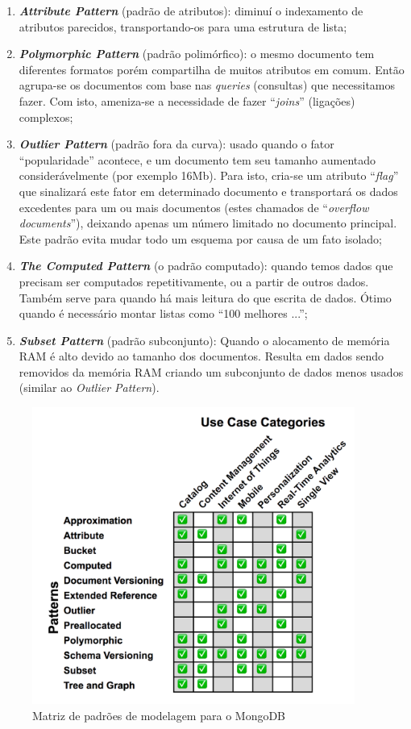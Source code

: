 \documentclass[
	12pt,				%
	openright,			%
	oneside,			%
	a4paper,			%
	english,			%
	french,				%
	spanish,			%
	brazil,				%
	]{abntex2}
\begin{document}
\begin{enumerate}
  \item \textbf{\textit{Attribute Pattern}} (padrão de atributos): diminuí o indexamento de atributos parecidos, transportando-os para uma estrutura de lista;
  \item \textbf{\textit{Polymorphic Pattern}} (padrão polimórfico): o mesmo documento tem diferentes formatos porém compartilha de muitos atributos em comum. Então agrupa-se os documentos com base nas \textit{queries} (consultas) que necessitamos fazer. Com isto, ameniza-se a necessidade de fazer ``\textit{joins}'' (ligações) complexos;
  \item \textbf{\textit{Outlier Pattern}} (padrão fora da curva): usado quando o fator ``popularidade'' acontece, e um documento tem seu tamanho aumentado considerávelmente (por exemplo 16Mb). Para isto, cria-se um atributo ``\textit{flag}'' que sinalizará este fator em determinado documento e transportará os dados excedentes para um ou mais documentos (estes chamados de ``\textit{overflow documents}''), deixando apenas um número limitado no documento principal. Este padrão evita mudar todo um esquema por causa de um fato isolado;
  \item \textbf{\textit{The Computed Pattern}} (o padrão computado): quando temos dados que precisam ser computados repetitivamente, ou a partir de outros dados. Também serve para quando há mais leitura do que escrita de dados. Ótimo quando é necessário montar listas como ``100 melhores ...'';
  \item \textbf{\textit{Subset Pattern}} (padrão subconjunto): Quando o alocamento de memória RAM é alto devido ao tamanho dos documentos. Resulta em dados sendo removidos da memória RAM criando um subconjunto de dados menos usados (similar ao \textit{Outlier Pattern}).
\end{enumerate}

\begin{figure}[!htpb]
	\centering
	\includegraphics[width=300pt]{./imagens/patternsmatrix.png}
	\caption{Matriz de padrões de modelagem para o MongoDB}
	\label{plot:patternmatrix}
\end{figure}
\end{document}
